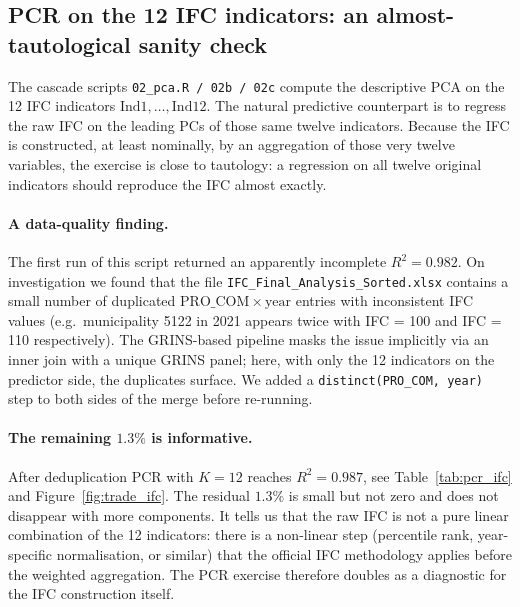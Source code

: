 \documentclass[11pt,a4paper]{article}
\begin{document}
\subsection{PCR on the 12 IFC indicators: an almost-tautological sanity check}

The cascade scripts \texttt{02\_pca.R / 02b / 02c} compute the
descriptive PCA on the 12 IFC indicators
\(\mathrm{Ind1},\dots,\mathrm{Ind12}\). The natural predictive
counterpart is to regress the raw IFC on the leading PCs of those
same twelve indicators. Because the IFC is constructed, at least
nominally, by an aggregation of those very twelve variables, the
exercise is close to tautology: a regression on all twelve original
indicators should reproduce the IFC almost exactly.

\paragraph{A data-quality finding.}
The first run of this script returned an apparently incomplete
\(R^{2} = 0.982\). On investigation we found that the file
\texttt{IFC\_Final\_Analysis\_Sorted.xlsx} contains a small number
of duplicated \(\mathrm{PRO\_COM} \times \mathrm{year}\) entries
with inconsistent IFC values (e.g.\ municipality 5122 in 2021
appears twice with IFC = 100 and IFC = 110 respectively). The
GRINS-based pipeline masks the issue implicitly via an inner join
with a unique GRINS panel; here, with only the 12 indicators on
the predictor side, the duplicates surface. We added a
\verb|distinct(PRO_COM, year)| step to both sides of the merge
before re-running.

\paragraph{The remaining \(1.3\%\) is informative.}
After deduplication PCR with \(K = 12\) reaches
\(R^{2} = 0.987\), see Table~\ref{tab:pcr_ifc} and
Figure~\ref{fig:trade_ifc}. The residual \(1.3\%\) is small but
not zero and does not disappear with more components. It tells us
that the raw IFC is not a pure linear combination of the 12
indicators: there is a non-linear step (percentile rank,
year-specific normalisation, or similar) that the official IFC
methodology applies before the weighted aggregation. The PCR
exercise therefore doubles as a diagnostic for the IFC
construction itself.
\end{document}
